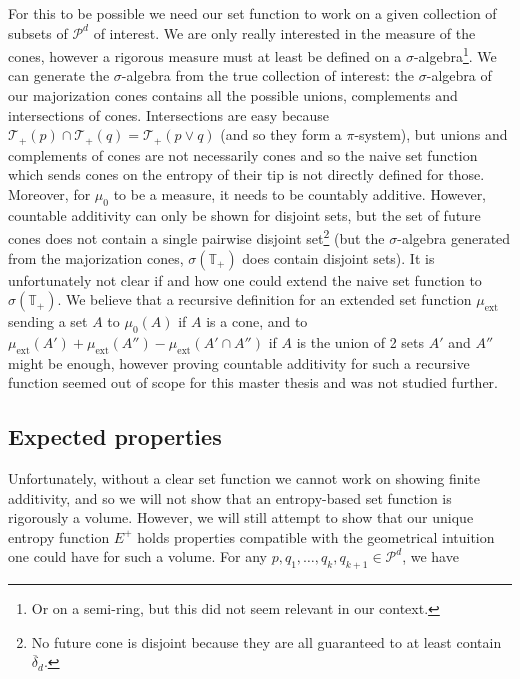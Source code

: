 For this to be possible we need our set function to work on a given collection of subsets of $\mathcal{P}^d$ of interest. We are only really interested in the measure of the cones, however a rigorous measure must at least be defined on a $\sigma$-algebra\footnote{Or on a semi-ring, but this did not seem relevant in our context.}. We can generate the $\sigma$-algebra from the true collection of interest: the $\sigma$-algebra of our majorization cones contains all the possible unions, complements and intersections of cones. Intersections are easy because $\mathcal{T}_+(p) \cap \mathcal{T}_+(q) = \mathcal{T}_+(p \vee q)$ (and so they form a $\pi$-system), but unions and complements of cones are not necessarily cones and so the naive set function which sends cones on the entropy of their tip is not directly defined for those. Moreover, for $\mu_0$ to be a measure, it needs to be countably additive. However, countable additivity can only be shown for disjoint sets, but the set of future cones does not contain a single pairwise disjoint set\footnote{No future cone is disjoint because they are all guaranteed to at least contain $\overline{\delta}_d$.} (but the $\sigma$-algebra generated from the majorization cones, $\sigma(\mathbb{T_+})$ does contain disjoint sets). It is unfortunately not clear if and how one could extend the naive set function to $\sigma(\mathbb{T_+})$. We believe that a recursive definition for an extended set function $\mu_{\text{ext}}$ sending a set $A$ to $\mu_0(A)$ if $A$ is a cone, and to $\mu_{\text{ext}}(A') +\mu_{\text{ext}}(A'') - \mu_{\text{ext}}(A' \cap A'')$ if $A$ is the union of 2 sets $A'$ and $A''$ might be enough, however proving countable additivity for such a recursive function seemed out of scope for this master thesis and was not studied further.



\subsection{Expected properties} \label{sec:unique_entropy_properties}

Unfortunately, without a clear set function we cannot work on showing finite additivity, and so we will not show that an entropy-based set function is rigorously a volume. However, we will still attempt to show that our unique entropy function $E^+$ holds properties compatible with the geometrical intuition one could have for such a volume. For any $p, q_1, \dots, q_k, q_{k+1} \in \mathcal{P}^d$, we have

